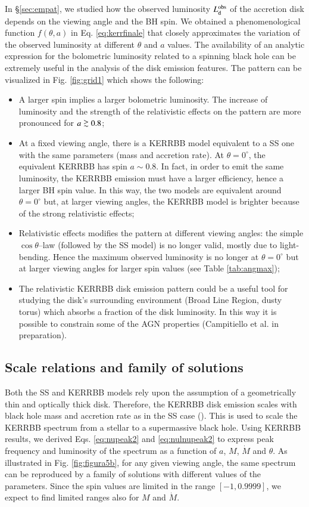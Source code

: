 \documentclass{aa}
\def\spose#1{\hbox to 0pt{#1\hss}}
\newcommand\gsim{\mathrel{\spose{\lower 3pt\hbox{$\mathchar"218$}}
     \raise 2.0pt\hbox{$\mathchar"13E$}}}
\begin{document}
In \S \ref{sec:empat}, we studied how the observed luminosity $L^{\rm obs}_{\rm d}$ of the accretion disk depends on the viewing angle and the BH spin. We obtained a phenomenological function $f(\theta,a)$ in Eq. \ref{eq:kerrfinale} that closely approximates the variation of the observed luminosity at different $\theta$ and $a$ values. The availability of an analytic expression for the bolometric luminosity related to a spinning black hole can be extremely useful in the analysis of the disk emission features. The pattern can be visualized in Fig. \ref{fig:grid1} which shows the following:
\begin{itemize}
	\item A larger spin implies a larger bolometric luminosity. The increase of luminosity and the strength of the relativistic effects on the pattern are more pronounced for $a \gsim 0.8$;	
	\item At a fixed viewing angle, there is a KERRBB model equivalent to a SS one with the same parameters (mass and accretion rate). At $\theta = 0^{\circ}$, the equivalent KERRBB has spin $a \sim 0.8$. In fact, in order to emit the same luminosity, the KERRBB emission must have a larger efficiency, hence a larger BH spin value. In this way, the two models are equivalent around $\theta = 0^{\circ}$ but, at larger viewing angles, the KERRBB model is brighter because of the strong relativistic effects;
	\item Relativistic effects modifies the pattern at different viewing angles: the simple $\cos\theta$--law (followed by the SS model) is no longer valid, mostly due to light-bending. Hence the maximum observed luminosity is no longer at $\theta = 0^{\circ}$ but at larger viewing angles for larger spin values (see Table \ref{tab:angmax});
	\item The relativistic KERRBB disk emission pattern could be a useful tool for studying the disk's surrounding environment (Broad Line Region, dusty torus) which absorbs a fraction of the disk luminosity. In this way it is possible to constrain some of the AGN properties (Campitiello et al. in preparation).
\end{itemize}


\subsection{Scale relations and family of solutions}

Both the SS and KERRBB models rely upon the assumption of a geometrically thin and optically thick disk. Therefore, the KERRBB disk emission scales with black hole mass and accretion rate as in the SS case (\citealt{Caldero}). 
This is used to scale the KERRBB spectrum from a stellar to a supermassive black hole. Using KERRBB results, we derived Eqs. \ref{eq:nupeak2} and \ref{eq:nulnupeak2} to express peak frequency and luminosity of the spectrum as a function of $a$, $M$, $\dot{M}$ and $\theta$. As illustrated in Fig. \ref{fig:figura5b}, for any given viewing angle, the same spectrum can be reproduced by a family of solutions with different values of the parameters. Since the spin values are limited in the range $[-1,0.9999]$, we expect to find limited ranges also for $M$ and $\dot{M}$. 
\end{document}
